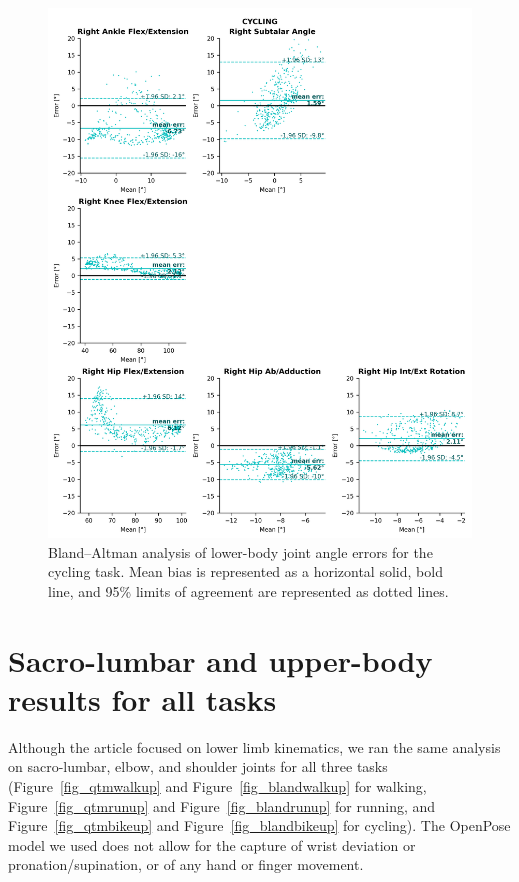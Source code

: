 \begin{figure}[!ht]
	\centering
	\def\svgwidth{1\columnwidth}
	\fontsize{10pt}{10pt}\selectfont
	\includegraphics[height=\dimexpr\textheight-119pt]{"../Annexes/Figures/Fig_BlandBike.png"}
	\caption{Bland–Altman analysis of lower-body joint angle errors for the cycling task. Mean bias is represented as a horizontal solid, bold line, and 95\% limits of agreement are represented as dotted lines.}
	\label{fig_blandbike}
\end{figure}

\clearpage

\section{Sacro-lumbar and upper-body results for all tasks}

Although the article focused on lower limb kinematics, we ran the same analysis on sacro-lumbar, elbow, and shoulder joints for all three tasks (Figure~\ref{fig_qtmwalkup} and Figure~\ref{fig_blandwalkup} for walking, Figure~\ref{fig_qtmrunup} and Figure~\ref{fig_blandrunup} for running, and Figure~\ref{fig_qtmbikeup} and Figure~\ref{fig_blandbikeup} for cycling). The OpenPose model we used does not allow for the capture of wrist deviation or pronation/supination, or of any hand or finger movement.

